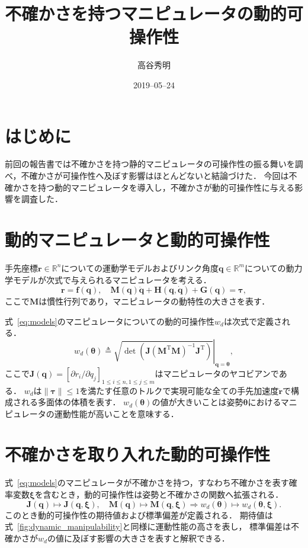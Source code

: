 \documentclass[10pt,a4j,twocolumn]{ltjsarticle}
\title{不確かさを持つマニピュレータの動的可操作性} %
\author{高谷秀明}                              %
\date{2019--05--24}                              %
\begin{document}
\maketitle

\section{はじめに}

前回の報告書では不確かさを持つ静的マニピュレータの可操作性の振る舞いを調べ，不確かさが可操作性へ及ぼす影響はほとんどないと結論づけた．
今回は不確かさを持つ動的マニピュレータを導入し，不確かさが動的可操作性に与える影響を調査した．

\section{動的マニピュレータと動的可操作性}

手先座標$\bm{r} \in \mathbb{R}^{n}$についての運動学モデルおよびリンク角度$\bm{q} \in \mathbb{R}^{m}$についての動力学モデルが次式で与えられるマニピュレータを考える．
\begin{equation}
  \bm{r} = \bm{f}(\bm{q}),
  \quad
  \bm{M}(\bm{q}) \ddot{\bm{q}} + \bm{H}(\bm{q}, \dot{\bm{q}}) + \bm{G}(\bm{q}) = \bm{\tau},
  \label{eq:models}
\end{equation}
ここで$\bm{M}$は慣性行列であり，マニピュレータの動特性の大きさを表す．

式~\eqref{eq:models}のマニピュレータについての動的可操作性$w_{d}$は次式で定義される．
\begin{equation}
  w_{d}(\bm{\theta}) \triangleq \left. \sqrt{\det\left(\bm{J}\left(\bm{M}^{\mathrm{T}}\bm{M}\right)^{-1}\bm{J}^{\mathrm{T}}\right)} \right|_{\bm{q}=\bm{\theta}},
  \label{fig:dynamic_manipulability}
\end{equation}
ここで$\bm{J}(\bm{q}) = [\partial r_{i} / \partial q_{j}]_{1 \leq i \leq n, 1 \leq j \leq m}$はマニピュレータのヤコビアンである．
$w_{d}$は$\|\bm{\tau}\| \leq 1$を満たす任意のトルクで実現可能な全ての手先加速度$\ddot{\bm{r}}$で構成される多面体の体積を表す．
$w_{d}(\bm{\theta})$の値が大きいことは姿勢$\bm{\theta}$におけるマニピュレータの運動性能が高いことを意味する．

\section{不確かさを取り入れた動的可操作性}

式~\eqref{eq:models}のマニピュレータが不確かさを持つ，すなわち不確かさを表す確率変数$\bm{\xi}$を含むとき，動的可操作性は姿勢と不確かさの関数へ拡張される．
\begin{equation}
  \bm{J}(\bm{q}) \mapsto \bm{J}(\bm{q}, \bm{\xi}), \quad
  \bm{M}(\bm{q}) \mapsto \bm{M}(\bm{q}, \bm{\xi}) \Rightarrow
  w_d(\bm{\theta}) \mapsto w_d(\bm{\theta}, \bm{\xi}).
  \label{eq:expansion}
\end{equation}
このとき動的可操作性の期待値および標準偏差が定義される．
期待値は式~\eqref{fig:dynamic_manipulability}と同様に運動性能の高さを表し，
標準偏差は不確かさが$w_{d}$の値に及ぼす影響の大きさを表すと解釈できる．
\end{document}
